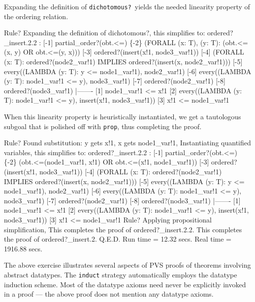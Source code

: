 \documentclass[11pt,twoside]{book}
\begin{document}
Expanding the definition of \texttt{dichotomous?}\ yields the needed
linearity property of the ordering relation.
\begin{session*}
Rule? 
Expanding the definition of dichotomous?,
this simplifies to: 
ordered?_insert.2.2 :  
[-1]   partial_order?(obt.<=)
\{-2\}   (FORALL (x: T), (y: T): (obt.<=(x, y) OR obt.<=(y, x)))
[-3]   ordered?(insert(x!1, node3_var!1))
[-4]   (FORALL (x: T):
         ordered?(node2_var!1) IMPLIES ordered?(insert(x, node2_var!1)))
[-5]   every((LAMBDA (y: T): y <= node1_var!1), node2_var!1)
[-6]   every((LAMBDA (y: T): node1_var!1 <= y), node3_var!1)
[-7]   ordered?(node2_var!1)
[-8]   ordered?(node3_var!1)
  |-------
[1]   node1_var!1 <= x!1
[2]   every((LAMBDA (y: T): node1_var!1 <= y), insert(x!1, node3_var!1))
[3]   x!1 <= node1_var!1
\end{session*}
When this linearity property is heuristically instantiated, we get a
tautologous subgoal that is polished off with \texttt{prop}, thus completing
the proof.
\begin{session*}
Rule? 
Found substitution:
y gets x!1,
x gets node1_var!1,
Instantiating quantified variables,
this simplifies to: 
ordered?_insert.2.2 :  
[-1]   partial_order?(obt.<=)
\{-2\}   (obt.<=(node1_var!1, x!1) OR obt.<=(x!1, node1_var!1))
[-3]   ordered?(insert(x!1, node3_var!1))
[-4]   (FORALL (x: T):
         ordered?(node2_var!1) IMPLIES ordered?(insert(x, node2_var!1)))
[-5]   every((LAMBDA (y: T): y <= node1_var!1), node2_var!1)
[-6]   every((LAMBDA (y: T): node1_var!1 <= y), node3_var!1)
[-7]   ordered?(node2_var!1)
[-8]   ordered?(node3_var!1)
  |-------
[1]   node1_var!1 <= x!1
[2]   every((LAMBDA (y: T): node1_var!1 <= y), insert(x!1, node3_var!1))
[3]   x!1 <= node1_var!1
Rule? 
Applying propositional simplification,
This completes the proof of ordered?_insert.2.2.
This completes the proof of ordered?_insert.2.
Q.E.D.
Run time  = 12.32 secs.
Real time = 1916.88 secs.
\end{session*}

The above exercise illustrates several aspects of PVS proofs of
theorems involving abstract datatypes.  The \texttt{induct} strategy
automatically employs the datatype induction scheme.  Most of the
datatype axioms need never be explicitly invoked in a proof ---
the above proof does not mention any datatype axioms.
\end{document}
